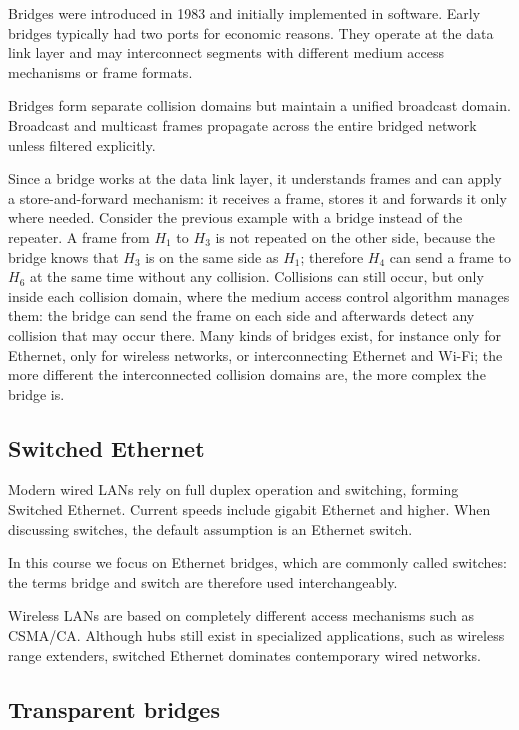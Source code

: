 \documentclass[11pt,a4paper,openany]{report}
\begin{document}
Bridges were introduced in 1983 and initially implemented in software. Early bridges typically had two ports for economic reasons. They operate at the data link layer and may interconnect segments with different medium access mechanisms or frame formats.

Bridges form separate collision domains but maintain a unified broadcast domain. Broadcast and multicast frames propagate across the entire bridged network unless filtered explicitly.

Since a bridge works at the data link layer, it understands frames and can apply a store-and-forward mechanism: it receives a frame, stores it and forwards it only where needed. Consider the previous example with a bridge instead of the repeater. A frame from $H_1$ to $H_3$ is not repeated on the other side, because the bridge knows that $H_3$ is on the same side as $H_1$; therefore $H_4$ can send a frame to $H_6$ at the same time without any collision. Collisions can still occur, but only inside each collision domain, where the medium access control algorithm manages them: the bridge can send the frame on each side and afterwards detect any collision that may occur there. Many kinds of bridges exist, for instance only for Ethernet, only for wireless networks, or interconnecting Ethernet and Wi-Fi; the more different the interconnected collision domains are, the more complex the bridge is.

\subsection{Switched Ethernet}

Modern wired LANs rely on full duplex operation and switching, forming Switched Ethernet. Current speeds include gigabit Ethernet and higher. When discussing switches, the default assumption is an Ethernet switch.

In this course we focus on Ethernet bridges, which are commonly called switches: the terms bridge and switch are therefore used interchangeably.

Wireless LANs are based on completely different access mechanisms such as CSMA/CA. Although hubs still exist in specialized applications, such as wireless range extenders, switched Ethernet dominates contemporary wired networks.

\subsection{Transparent bridges}
\end{document}
